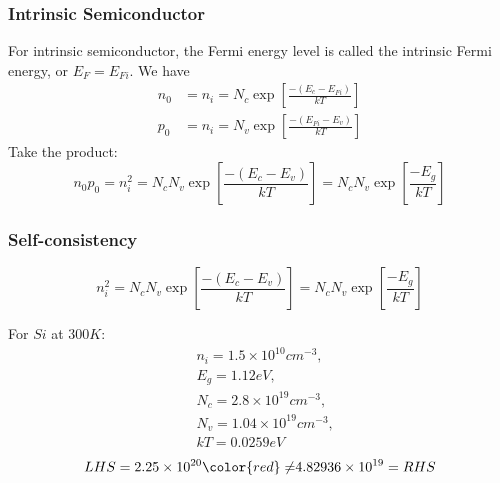\documentclass{beamer}
\begin{document}
    \begin{frame} \frametitle{Intrinsic Semiconductor}
        For intrinsic semiconductor, the Fermi energy level is called the intrinsic Fermi energy, or $E_F = E_{Fi}$. We have
        \begin{equation*}
            \begin{aligned}
                n_0 &= n_i = N_c \exp \left[ \frac{-(E_c - E_{Fi})}{kT}\right] \\
                p_0 &= n_i = N_v \exp \left[ \frac{-(E_{Fi} -E_v)}{kT}  \right]
            \end{aligned}
        \end{equation*}
        Take the product:
        \begin{equation*}
            \boxed{n_0 p_0 = n_i^2 = N_cN_v \exp \left[ \frac{-(E_c - E_v)}{kT}  \right] = N_c N_v \exp \left[ \frac{-E_g}{kT}  \right]}
        \end{equation*}
    \end{frame}

    \begin{frame}[t] \frametitle{Self-consistency}
        \begin{equation*}
            n_i^2 = N_cN_v \exp \left[ \frac{-(E_c - E_v)}{kT}  \right] = N_c N_v \exp \left[ \frac{-E_g}{kT}  \right]
        \end{equation*}
        \vspace{2em}
        \par For $Si$ at $300K$:
        \begin{equation*}
            \begin{aligned}
                &n_i = 1.5 \times 10^{10} cm^{-3},\\ &E_g = 1.12 eV, \\ 
                &N_c = 2.8 \times 10^{19} cm^{-3},\\ &N_v = 1.04 \times 10^{19} cm^{-3},\\ &kT = 0.0259 eV
            \end{aligned}
        \end{equation*}
        \begin{equation*}
            LHS = 2.25 \times 10^{20} {\color{red} \neq } 4.82936 \times 10^{19} = RHS  
        \end{equation*}
    \end{frame}
\end{document}
